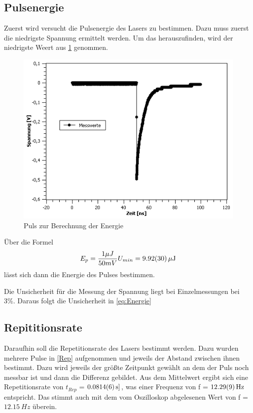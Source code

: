 \documentclass[
	a4paper,
	12pt,
	pagesize,
	ngerman
]{scrartcl}
\begin{document}
\subsection{Pulsenergie}
Zuerst wird versucht die Pulsenergie des Lasers zu bestimmen. Dazu muss zuerst die niedrigste Spannung ermittelt werden. Um das herauszufinden, wird der niedrigste Weert aus \cref{Energie} genommen. 

\begin{figure}[h!]
	\centering
	\includegraphics[scale=0.7]{Energie.png}
	\caption{Puls zur Berechnung der Energie}
	\label{Energie}
\end{figure}

Über die Formel
\begin{equation}
E_{p} = \dfrac{1 \mu J}{50mV}U_{min} = \SI{9,92 \pm 0,30}{\mu J} 
\label{eq:Energie}
\end{equation}
lässt sich dann die Energie des Pulses bestimmen.

Die Unsicherheit für die Messung der Spannung liegt bei Einzelmessungen bei 3\%. Daraus folgt die Unsicherheit in \cref{eq:Energie}

\subsection{Repititionsrate}
Daraufhin soll die Repetitionsrate des Lasers bestimmt werden. Dazu wurden mehrere Pulse in \cref{Rep} aufgenommen und jeweils der Abstand zwischen ihnen bestimmt. Dazu wird jeweils der größte Zeitpunkt gewählt an dem der Puls noch messbar ist und dann die Differenz gebildet. Aus dem Mittelwert ergibt sich eine Repetitionsrate von $t_{Rep}$ = $\SI{0,0814 \pm 0,0006}{s]}$, was einer Frequenz von f = $\SI{12,29 \pm 0,09}{Hz}$ entspricht. Das stimmt auch mit dem vom Oszilloskop abgelesenen Wert von f = $\SI{12,15}{Hz}$ überein.
\end{document}
